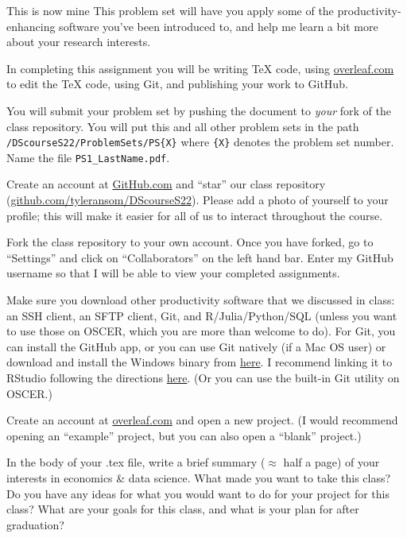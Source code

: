 \documentclass[12pt,english]{exam}
\begin{document}
This is now mine
This problem set will have you apply some of the productivity-enhancing software you've been introduced to, and help me learn a bit more about your research interests.

In completing this assignment you will be writing TeX code, using \url{overleaf.com} to edit the TeX code, using Git, and publishing your work to GitHub.

You will submit your problem set by pushing the document to \emph{your} fork of the class repository. You will put this and all other problem sets in the path \texttt{/DScourseS22/ProblemSets/PS\{X\}} where \texttt{\{X\}} denotes the problem set number. Name the file \texttt{PS1\_LastName.pdf}.

\begin{questions}
\question Create an account at \url{GitHub.com} and ``star'' our class repository (\url{github.com/tyleransom/DScourseS22}). Please add a photo of yourself to your profile; this will make it easier for all of us to interact throughout the course.

\question Fork the class repository to your own account. Once you have forked, go to ``Settings'' and click on ``Collaborators'' on the left hand bar. Enter my GitHub username so that I will be able to view your completed assignments.

\question Make sure you download other productivity software that we discussed in class: an SSH client, an SFTP client, Git, and R/Julia/Python/SQL (unless you want to use those on OSCER, which you are more than welcome to do). For Git, you can install the GitHub app, or you can use Git natively (if a Mac OS user) or download and install the Windows binary from \href{https://git-scm.com/download/win}{here}. I recommend linking it to RStudio following the directions \href{https://raw.githack.com/uo-ec607/lectures/master/02-git/02-Git.html#13}{here}. (Or you can use the built-in Git utility on OSCER.)

\question Create an account at \url{overleaf.com} and open a new project. (I would recommend opening an ``example'' project, but you can also open a ``blank'' project.)

\question In the body of your .tex file, write a brief summary ($\approx$ half a page) of your interests in economics \& data science. What made you want to take this class? Do you have any ideas for what you would want to do for your project for this class? What are your goals for this class, and what is your plan for after graduation?


\end{questions}
\end{document}
